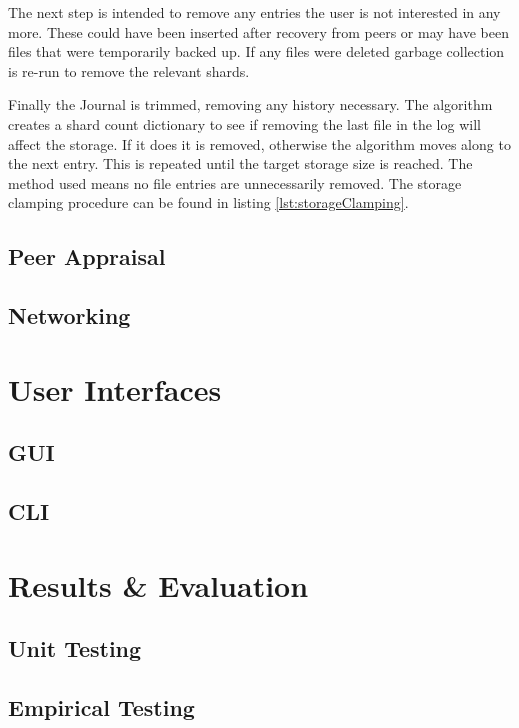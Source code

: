 \documentclass[11pt, a4paper, twocolumn, twoside]{report}
\begin{document}
The next step is intended to remove any entries the user is not interested in any more. These could have been inserted after recovery from peers or may have been files that were temporarily backed up. If any files were deleted garbage collection is re-run to remove the relevant shards.

Finally the Journal is trimmed, removing any history necessary. The algorithm creates a shard count dictionary to see if removing the last file in the log will affect the storage. If it does it is removed, otherwise the algorithm moves along to the next entry. This is repeated until the target storage size is reached. The method used means no file entries are unnecessarily removed. The storage clamping procedure can be found in listing \ref{lst:storageClamping}.

\section{Peer Appraisal}

\section{Networking}

\chapter{User Interfaces}

\section{GUI}

\section{CLI}

\chapter{Results \& Evaluation}

\section{Unit Testing}

\section{Empirical Testing}
\end{document}
